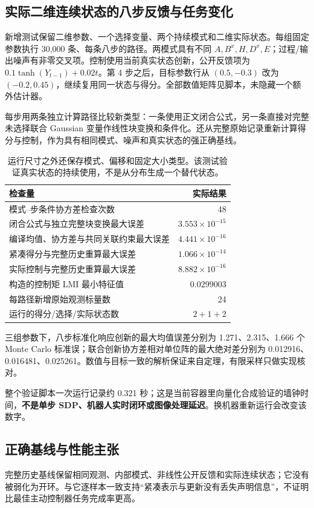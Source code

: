 \documentclass[UTF8,fontset=fandol,11pt,a4paper]{ctexart}
\theoremstyle{definition}\newtheorem{definition}[theorem]{定义}\newtheorem{assumption}[theorem]{条件}
\numberwithin{equation}{section}
\begin{document}
\subsection{实际二维连续状态的八步反馈与任务变化}
新增测试保留二维参数、一个选择变量、两个持续模式和二维实际状态。每组固定参数执行 30,000 条、每条八步的路径。两模式具有不同 $A,B^x,H,D^x,E$；过程/输出噪声有非零交叉项。控制使用当前真实状态创新，公开反馈项为 $0.1\tanh(Y_{t-1})+0.02t$。第 4 步之后，目标参数行从 $(0.5,-0.3)$ 改为 $(-0.2,0.45)$，继续复用同一状态与得分。全部数值矩阵见脚本，未隐藏一个额外估计器。

每步用两条独立计算路径比较新类型：一条使用正文闭合公式，另一条直接对完整未选择联合 Gaussian 变量作线性块变换和条件化。还从完整原始记录重新计算得分与控制，作为具有相同模式、噪声和真实状态的强正确基线。

\begin{table}[ht]\centering\small
\begin{tabularx}{\linewidth}{Yr}
\toprule
检查量 & 实际结果\\\midrule
模式--步条件协方差检查次数 & 48\\
闭合公式与独立完整块变换最大误差 & $3.553\times10^{-15}$\\
编译均值、协方差与共同关联约束最大误差 & $4.441\times10^{-16}$\\
紧凑得分与完整历史重算最大误差 & $1.066\times10^{-14}$\\
实际控制与完整历史重算最大误差 & $8.882\times10^{-16}$\\
构造的控制矩 LMI 最小特征值 & $0.0299003$\\
每路径新增原始观测标量数 & 24\\
运行的得分/选择/实际状态数 & $2+1+2$\\
\bottomrule
\end{tabularx}
\caption{运行尺寸之外还保存模式、偏移和固定大小类型。该测试验证真实状态的持续使用，不是从分布生成一个替代状态。}
\end{table}

三组参数下，八步标准化响应创新的最大均值误差分别为 1.271、2.315、1.666 个 Monte Carlo 标准误；联合创新协方差相对单位阵的最大绝对差分别为 0.012916、0.016481、0.025261。数值与目标一致的解析保证来自定理，有限采样只做实现核对。

整个验证脚本一次运行记录约 0.321 秒；这是当前容器里向量化合成验证的墙钟时间，\textbf{不是单步 SDP、机器人实时闭环或图像处理延迟}。换机器重新运行会改变该数字。

\subsection{正确基线与性能主张}
完整历史基线保留相同观测、内部模式、非线性公开反馈和实际连续状态；它没有被弱化为开环。与它逐样本一致支持“紧凑表示与更新没有丢失声明信息”，不证明比最佳主动控制器任务完成率更高。
\end{document}

